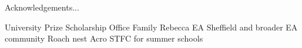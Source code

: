 \begin{acknowledgementslong}

Acknowledgements...

University Prize Scholarship
Office
Family
Rebecca
EA Sheffield and broader EA community
Roach nest
Acro
STFC for summer schools

\end{acknowledgementslong}